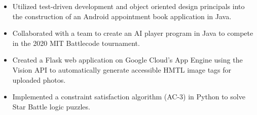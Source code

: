 \documentclass[11pt]{article}
\begin{document}
\begin{itemize}[leftmargin=*, itemsep=0pt, topsep=5pt]
	\item Utilized test-driven development and object oriented design principals into the construction of an Android appointment book application in Java.
	\item Collaborated with a team to create an AI player program in Java to compete in the 2020 MIT Battlecode tournament.
	\item Created a Flask web application on Google Cloud’s App Engine using the Vision API to automatically generate accessible HMTL image tags for uploaded photos.
	\item Implemented a constraint satisfaction algorithm (AC-3) in Python to solve Star Battle logic puzzles.
\end{itemize} 
\smallskip
\end{document}
